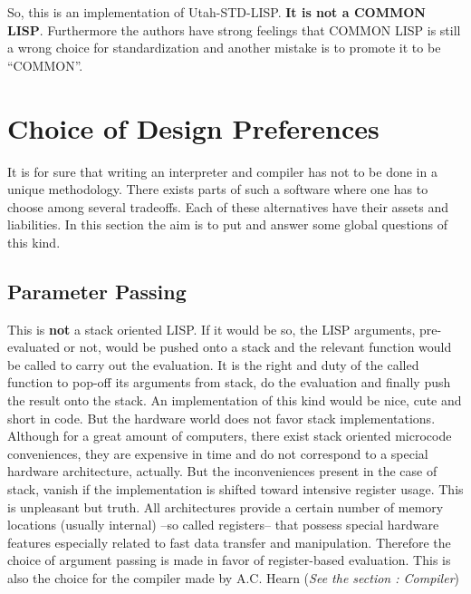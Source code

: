 So, this is an implementation of Utah-STD-LISP. {\bf It is not
a COMMON LISP}. Furthermore the authors have strong feelings that
COMMON LISP is still a wrong choice for  standardization and
another mistake is to promote it to be ``COMMON''.





\section{Choice of Design Preferences}
It is for sure that writing an interpreter and compiler has not to be  done
in  a  unique  methodology. There exists parts of such a software where one
has to choose among several tradeoffs.  Each  of  these  alternatives  have
their  assets and liabilities. In this section the aim is to put and answer
some global questions of this kind.

\subsection{Parameter Passing}

This is {\bf not} a stack oriented LISP.  If  it  would  be  so,  the  LISP
arguments, pre-evaluated  or  not,  would  be  pushed  onto  a stack and the
relevant function would be called to carry out the evaluation.  It  is  the
right  and duty of the called function to pop-off its arguments from stack,
do  the  evaluation  and  finally  push  the  result  onto  the  stack.  An
implementation  of this kind would be nice, cute and short in code. But the
hardware world does not favor stack implementations. Although for  a  great
amount  of  computers,  there  exist stack oriented microcode conveniences,
they are expensive in time and do not  correspond  to  a  special  hardware
architecture,  actually.  But  the  inconveniences  present  in the case of
stack, vanish if the implementation is shifted  toward  intensive  register
usage.  This  is  unpleasant but truth. All architectures provide a certain
number of memory locations (usually internal) --so called registers--  that
possess  special hardware features especially related to fast data transfer
and manipulation. Therefore the choice of argument passing is made in favor
of register-based evaluation. This is also the choice for the compiler made
by A.C. Hearn ({\em See the section : Compiler})

